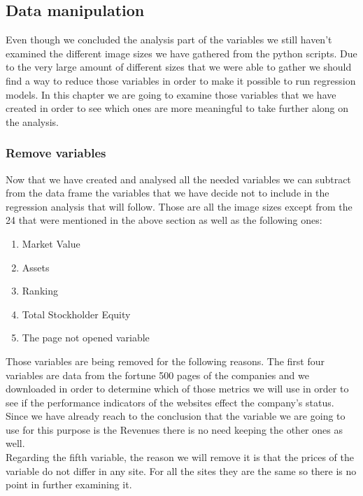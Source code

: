 \documentclass{book}
\begin{document}
\subsection{Data manipulation}
Even though we concluded the analysis part of the variables we still haven't examined the different image sizes we have gathered from the python scripts. Due to the very large amount of different sizes that we were able to gather we should find a way to reduce those variables in order to make it possible to run regression models. In this chapter we are going to examine those variables that we have created in order to see which ones are more meaningful to take further along on the analysis. 
\subsubsection{Remove variables}
Now that we have created and analysed all the needed variables we can subtract from the data frame the variables that we have decide not to include in the regression analysis that will follow. Those are all the image sizes except from the 24 that were mentioned in the above section as well as the following ones:
\begin{enumerate}
\item Market Value 
\item Assets
\item Ranking
\item Total Stockholder Equity
\item The page not opened variable
\end{enumerate}
Those variables are being removed for the following reasons. The first four variables are data from the fortune 500 pages of the companies and we downloaded in order to determine which of those metrics we will use in order to see if the performance indicators of the websites effect the company's status. Since we have already reach to the conclusion that the variable we are going to use for this purpose is the Revenues there is no need keeping the other ones as well.\\
Regarding the fifth variable, the reason we will remove it is that the prices of the variable do not differ in any site. For all the sites they are the same so there is no point in further examining it.
\end{document}
